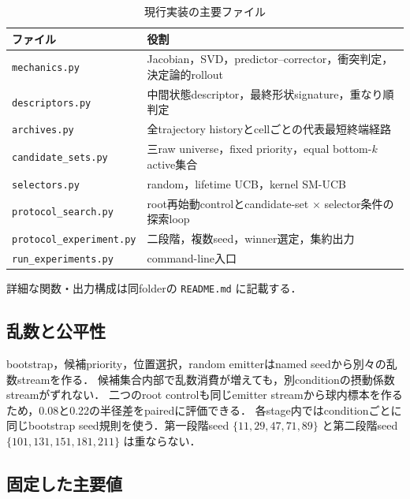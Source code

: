 \documentclass[a4paper,11pt]{ltjsarticle}
\newcommand{\code}[1]{\nolinkurl{#1}}
\begin{document}
\begin{table}[H]
\centering
\caption{現行実装の主要ファイル}
\begin{tabularx}{\linewidth}{p{43mm}Y}
\toprule
ファイル & 役割\\
\midrule
\code{mechanics.py} & Jacobian，SVD，predictor--corrector，衝突判定，決定論的rollout\\
\code{descriptors.py} & 中間状態descriptor，最終形状signature，重なり順判定\\
\code{archives.py} & 全trajectory historyとcellごとの代表最短終端経路\\
\code{candidate_sets.py} & 三raw universe，fixed priority，equal bottom-\(k\) active集合\\
\code{selectors.py} & random，lifetime UCB，kernel SM-UCB\\
\code{protocol_search.py} & root再始動controlとcandidate-set \(\times\) selector条件の探索loop\\
\code{protocol_experiment.py} & 二段階，複数seed，winner選定，集約出力\\
\code{run_experiments.py} & command-line入口\\
\bottomrule
\end{tabularx}
\end{table}
詳細な関数・出力構成は同folderの \code{README.md} に記載する．

\subsection{乱数と公平性}

bootstrap，候補priority，位置選択，random emitterはnamed seedから別々の乱数streamを作る．
候補集合内部で乱数消費が増えても，別conditionの摂動係数streamがずれない．
二つのroot controlも同じemitter streamから球内標本を作るため，0.08と0.22の半径差をpairedに評価できる．
各stage内ではconditionごとに同じbootstrap seed規則を使う．第一段階seed
\(\{11,29,47,71,89\}\) と第二段階seed
\(\{101,131,151,181,211\}\) は重ならない．

\subsection{固定した主要値}
\end{document}

